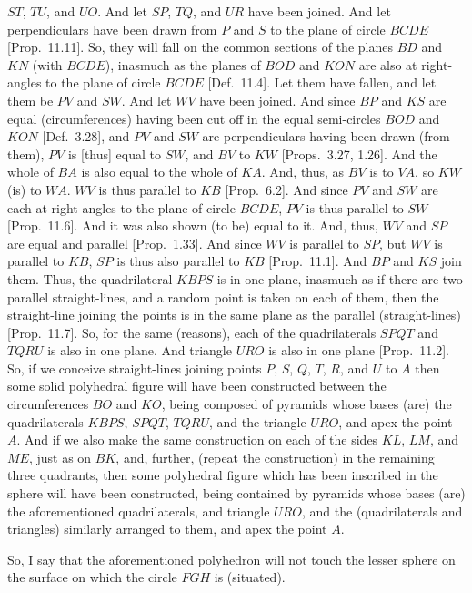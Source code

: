 $ST$, $TU$, and $UO$. And let $SP$, $TQ$, and $UR$ have been joined. And let perpendiculars have been drawn from
$P$ and $S$ to the plane of circle $BCDE$ [Prop.~11.11]. So, they will fall on the common sections of the planes $BD$ and $KN$ (with $BCDE$),
inasmuch as the planes of $BOD$ and $KON$ are also at right-angles to the plane of circle $BCDE$ [Def.~11.4].
Let them have fallen, and let them be $PV$ and $SW$.  And let $WV$ have been joined.  And since  $BP$ and
$KS$ are equal (circumferences) having been cut off  in the equal semi-circles $BOD$ and $KON$ [Def.~3.28], and  $PV$ and $SW$ are
perpendiculars having been drawn (from them), $PV$ is [thus] equal to $SW$, and $BV$ to $KW$ [Props.~3.27, 1.26]. And the whole of
$BA$ is also equal to the whole of $KA$. And, thus, as $BV$ is to $VA$, so $KW$ (is) to $WA$. 
$WV$ is thus parallel to $KB$ [Prop.~6.2]. And since $PV$ and $SW$ are each at right-angles to the plane
of circle $BCDE$,  $PV$ is thus parallel to $SW$ [Prop.~11.6]. And it was also shown (to be) equal to it.
And, thus, $WV$ and $SP$ are equal and parallel [Prop.~1.33]. And since $WV$ is parallel to $SP$,
but $WV$ is parallel to $KB$, $SP$ is thus also parallel to $KB$ [Prop.~11.1]. And  $BP$ and
$KS$ join them. Thus, the quadrilateral $KBPS$ is in one plane, inasmuch as if there are two parallel
straight-lines, and a random point is taken on each of them, then the straight-line joining the points is in the same plane as
the parallel (straight-lines) [Prop.~11.7]. So, for the same (reasons), each of the quadrilaterals
$SPQT$ and $TQRU$ is also in one plane. And triangle $URO$ is also in one plane [Prop.~11.2].
So, if we conceive straight-lines joining points $P$, $S$, $Q$, $T$, $R$,
and $U$ to $A$ then some solid polyhedral  figure will have been constructed between the circumferences $BO$ and $KO$,
being composed of pyramids whose bases (are) the quadrilaterals $KBPS$, $SPQT$, $TQRU$, and the triangle $URO$, 
and apex the point $A$. And if we also make the same construction on each of the sides $KL$, $LM$, and $ME$, just as on $BK$, 
and, further, (repeat the construction) in the remaining three quadrants, then some polyhedral figure
which has been inscribed in the sphere will have been constructed, being contained by pyramids whose bases (are) the
aforementioned quadrilaterals, and triangle $URO$, and the (quadrilaterals and triangles) similarly arranged
to them, and apex the point $A$.

So, I say that the aforementioned polyhedron  will not touch the lesser sphere on the surface on which  the circle $FGH$ is (situated).

